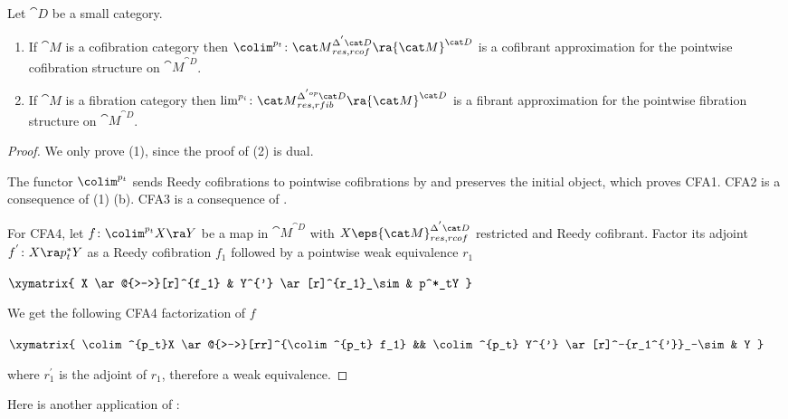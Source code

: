 \begin{prop}
\label{prop:generalpointwisecofstructureapprox}
Let ${\cat D}$ be a small category.
\begin{enumerate}
\item
If ${\cat M}$ is a cofibration category then $\colim^{p_t} \colon {\cat M}^{\Delta^{'}{\cat D}}_{res, rcof} \ra {\cat M}^{\cat D}$ is a cofibrant approximation for the pointwise cofibration structure on ${\cat M}^{\cat D}$.
\item
If ${\cat M}$ is a fibration category then $\lim^{p_i} \colon {\cat M}^{\Delta^{'op}{\cat D}}_{res, rfib} \ra {\cat M}^{\cat D}$ is a fibrant approximation for the pointwise fibration structure on ${\cat M}^{\cat D}$.
\end{enumerate}
\end{prop}

\begin{proof}
We only prove (1), since the proof of (2) is dual.

The functor $\colim^{p_t}$ sends Reedy cofibrations to pointwise cofibrations by  and preserves the initial object, which proves CFA1. CFA2 is a consequence of  (1) (b). CFA3 is a consequence of .

For CFA4, let $f \colon \colim^{p_t}X \ra Y$ be a map in ${\cat M}^{\cat D}$ with $X \eps {\cat M}^{\Delta^{'}{\cat D}}_{res, rcof}$ restricted and Reedy cofibrant. Factor its adjoint $f^{'} \colon X \ra p_t^*Y$ as a Reedy cofibration $f_1$ followed by a pointwise weak equivalence $r_1$
\begin{center}
$\xymatrix {
    X \ar@{>->}[r]^{f_1} & Y^{'} \ar[r]^{r_1}_\sim & p^*_tY
  } $
\end{center}
We get the following CFA4 factorization of $f$
\begin{center}
$\xymatrix {
    \colim^{p_t}X \ar@{>->}[rr]^{\colim^{p_t} f_1} && \colim^{p_t} Y^{'} \ar[r]^-{r_1^{'}}_-\sim & Y
  } $
\end{center}
where $r_1^{'}$ is the adjoint of $r_1$, therefore a weak equivalence.
\end{proof}

Here is another application of :

